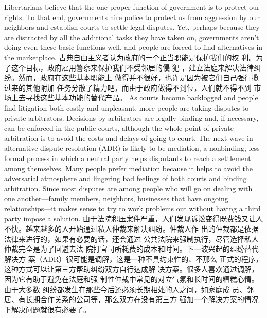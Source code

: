 \begin{paracol}{2}
Libertarians believe that the one proper function of government
is to protect our rights. To that end, governments hire police to
protect us from aggression by our neighbors and establish
courts to settle legal disputes. Yet, perhaps because they are distracted by all the additional tasks they have taken on, governments aren't doing even these basic functions well, and people
are forced to find alternatives in the marketplace.
\switchcolumn
古典自由主义者认为政府的一个正当职能是保护我们的权
利。为了这个目标，政府雇用警察来保护我们不受邻居的侵
犯 ，建立法庭来解决法律纠纷。然而，政府在这些基本职能上
做得并不很好，也许是因为被它们自己强行揽过来的其他附加
任务分散了精力吧，而由于政府做得不到位，人们就不得不到
市场上去寻找这些基本功能的替代产品。
\switchcolumn*
As courts become backlogged and people find litigation both
costly and unpleasant, more people are taking disputes to private arbitrators. Decisions by arbitrators are legally binding
and, if necessary, can be enforced in the public courts, although
the whole point of private arbitration is to avoid the costs and
delays of going to court. The next wave in alternative dispute
resolution (ADR) is likely to be mediation, a nonbinding, less
formal process in which a neutral party helps disputants to
reach a settlement among themselves. Many people prefer mediation because it helps to avoid the adversarial atmosphere and
lingering bad feelings of both courts and binding arbitration.
Since most disputes are among people who will go on dealing
with one another---family members, neighbors, businesses that
have ongoing relationships---it makes sense to try to work
problems out without having a third party impose a solution.
\switchcolumn
由于法院积压案件严重，人们发现诉讼变得既费钱又让人
不快。越来越多的人开始通过私人仲裁来解决纠纷。仲裁人作
出的仲裁都是依据法律来进行的，如果有必要的话，还会通过
公共法院来强制执行，尽管选择私人仲裁完全是为了回避去法
院打官司所耗费的成本和时间。下一波兴起的纠纷替代解决方
案（ADR）很可能是调解，这是一种不具约束性的、不那么
正式的程序，这种方式可以让第三方帮助纠纷双方自行达成解
决方案。很多人喜欢通过调解，因为它有助于避免在法庭和强
制性仲裁中常见的对立气氛和长时间的糟糕心情。由于大多数
纠纷都发生在那些今后还必须长期相处的人之间，如家庭成
员、邻居、有长期合作关系的公司等，那么双方在没有第三方
强加一个解决方案的情况下解决问题就很有必要了。

\end{paracol}
